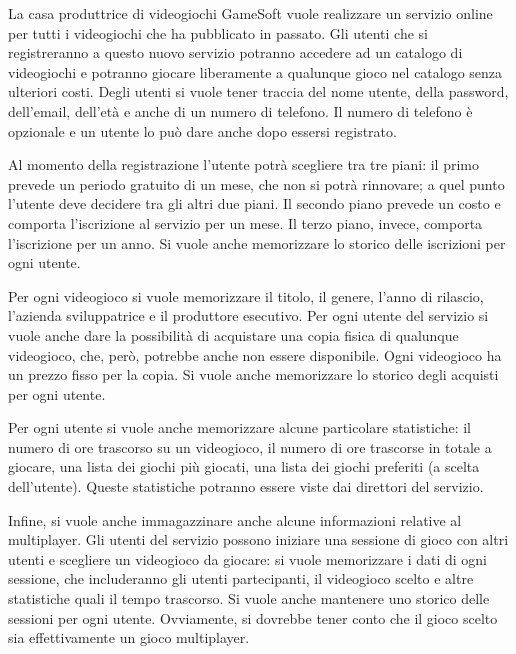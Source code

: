 \documentclass[a4paper,12pt]{report}
\begin{document}
\begin{addmargin}[4em]{4em}
La casa produttrice di videogiochi GameSoft vuole realizzare un servizio online per tutti i videogiochi che ha pubblicato in passato. Gli utenti che si registreranno a questo nuovo servizio potranno accedere ad un catalogo di videogiochi e potranno giocare liberamente a qualunque gioco nel catalogo senza ulteriori costi. Degli utenti si vuole tener traccia del nome utente, della password, dell'email, dell'età e anche di un numero di telefono. Il numero di telefono è opzionale e un utente lo può dare anche dopo essersi registrato.

Al momento della registrazione l'utente potrà scegliere tra tre piani: il primo prevede un periodo gratuito di un mese, che non si potrà rinnovare; a quel punto l'utente deve decidere tra gli altri due piani. Il secondo piano prevede un costo e comporta l'iscrizione al servizio per un mese. Il terzo piano, invece, comporta l'iscrizione per un anno. Si vuole anche memorizzare lo storico delle iscrizioni per ogni utente.

Per ogni videogioco si vuole memorizzare il titolo, il genere, l'anno di rilascio, l'azienda sviluppatrice e il produttore esecutivo. Per ogni utente del servizio si vuole anche dare la possibilità di acquistare una copia fisica di qualunque videogioco, che, però, potrebbe anche non essere disponibile. Ogni videogioco ha un prezzo fisso per la copia. Si vuole anche memorizzare lo storico degli acquisti per ogni utente.

Per ogni utente si vuole anche memorizzare alcune particolare statistiche: il numero di ore trascorso su un videogioco, il numero di ore trascorse in totale a giocare, una lista dei giochi più giocati, una lista dei giochi preferiti (a scelta dell'utente). Queste statistiche potranno essere viste dai direttori del servizio.

Infine, si vuole anche immagazzinare anche alcune informazioni relative al multiplayer. Gli utenti del servizio possono iniziare una sessione di gioco con altri utenti e scegliere un videogioco da giocare: si vuole memorizzare i dati di ogni sessione, che includeranno gli utenti partecipanti, il videogioco scelto e altre statistiche quali il tempo trascorso. Si vuole anche mantenere uno storico delle sessioni per ogni utente. Ovviamente, si dovrebbe tener conto che il gioco scelto sia effettivamente un gioco multiplayer. \\\\

\end{addmargin}
\end{document}
